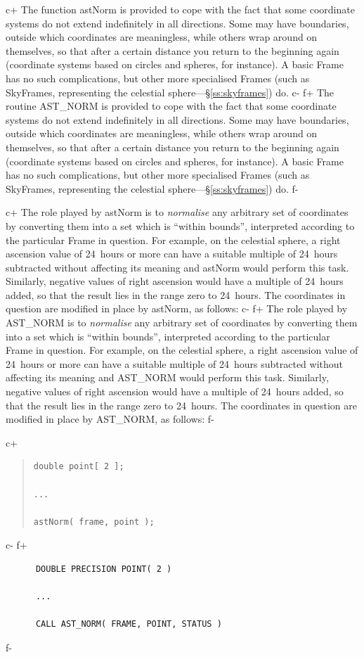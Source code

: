\documentclass[twoside,11pt]{article}
\newcommand{\secref}[1]{\S\ref{#1}}
\newcommand{\secref}[1]{\ref{#1}}
\begin{document}
c+
The function astNorm is provided to cope with the fact that some
coordinate systems do not extend indefinitely in all directions. Some
may have boundaries, outside which coordinates are meaningless, while
others wrap around on themselves, so that after a certain distance you
return to the beginning again (coordinate systems based on circles and
spheres, for instance). A basic Frame has no such complications, but
other more specialised Frames (such as SkyFrames, representing the
celestial sphere---\secref{ss:skyframes}) do.
c-
f+
The routine AST\_NORM is provided to cope with the fact that some
coordinate systems do not extend indefinitely in all directions. Some
may have boundaries, outside which coordinates are meaningless, while
others wrap around on themselves, so that after a certain distance you
return to the beginning again (coordinate systems based on circles and
spheres, for instance). A basic Frame has no such complications, but
other more specialised Frames (such as SkyFrames, representing the
celestial sphere---\secref{ss:skyframes}) do.
f-

c+
The role played by astNorm is to {\em{normalise}} any arbitrary set of
coordinates by converting them into a set which is ``within bounds'',
interpreted according to the particular Frame in question. For
example, on the celestial sphere, a right ascension value of 24~hours
or more can have a suitable multiple of 24~hours subtracted without
affecting its meaning and astNorm would perform this task. Similarly,
negative values of right ascension would have a multiple of 24~hours
added, so that the result lies in the range zero to 24~hours. The
coordinates in question are modified in place by astNorm, as follows:
c-
f+
The role played by AST\_NORM is to {\em{normalise}} any arbitrary set
of coordinates by converting them into a set which is ``within
bounds'', interpreted according to the particular Frame in
question. For example, on the celestial sphere, a right ascension
value of 24~hours or more can have a suitable multiple of 24~hours
subtracted without affecting its meaning and AST\_NORM would perform
this task. Similarly, negative values of right ascension would have a
multiple of 24~hours added, so that the result lies in the range zero
to 24~hours. The coordinates in question are modified in place by
AST\_NORM, as follows:
f-

c+
\begin{quote}
\small
\begin{verbatim}
double point[ 2 ];

...

astNorm( frame, point );
\end{verbatim}
\normalsize
\end{quote}
c-
f+
\small
\begin{verbatim}
      DOUBLE PRECISION POINT( 2 )

      ...

      CALL AST_NORM( FRAME, POINT, STATUS )
\end{verbatim}
\normalsize
f-
\end{document}
